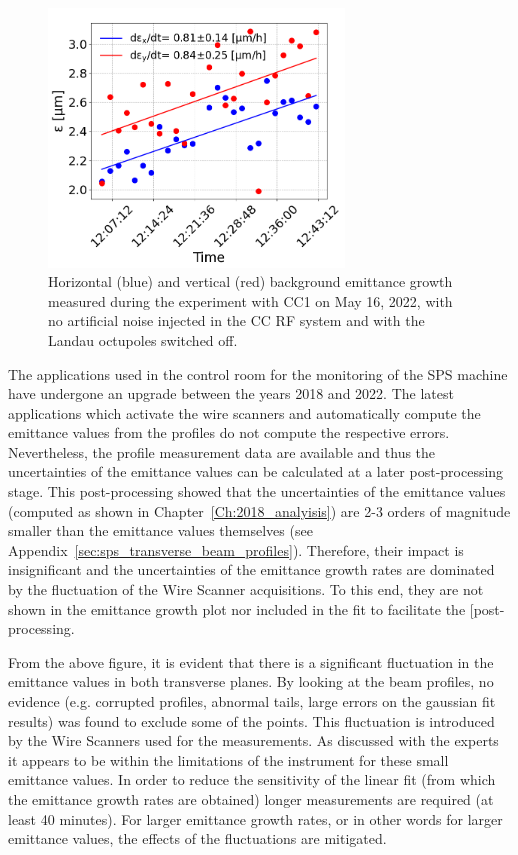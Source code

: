 \begin{figure}[!h] %
   \centering         
   \includegraphics[width=0.7\textwidth]{images/Ch8/cc_md_2022_background_in_scan.png}
       \caption{Horizontal (blue) and vertical (red) background emittance growth measured during the experiment with CC1 on May 16, 2022, with no artificial noise injected in the CC RF system and with the Landau octupoles switched off.}
       \label{fig:cc_md_2022_background_growth_in_scan}
\end{figure}

The applications used in the control room for the monitoring of the SPS machine have undergone an upgrade between the years 2018 and 2022. The latest applications which activate the wire scanners and automatically compute the emittance values from the profiles do not compute the respective errors. Nevertheless, the profile measurement data are available and thus the uncertainties of the emittance values can be calculated at a later post-processing stage. This post-processing showed that the uncertainties of the emittance values (computed as shown in Chapter~\ref{Ch:2018_analyisis}) are 2-3 orders of magnitude smaller than the emittance values themselves (see Appendix~\ref{sec:sps_transverse_beam_profiles}). Therefore, their impact is insignificant and the uncertainties of the emittance growth rates are dominated by the fluctuation of the Wire Scanner acquisitions. To this end, they are not shown in the emittance growth plot nor included in the fit to facilitate the [post-processing.

From the above figure, it is evident that there is a significant fluctuation in the emittance values in both transverse planes. By looking at the beam profiles, no evidence (e.g. corrupted profiles, abnormal tails, large errors on the gaussian fit results) was found to exclude some of the points. This fluctuation is introduced by the Wire Scanners used for the measurements. As discussed with the experts it appears to be within the limitations of the instrument for these small emittance values. In order to reduce the sensitivity of the linear fit (from which the emittance growth rates are obtained) longer measurements are required (at least 40 minutes). For larger emittance growth rates, or in other words for larger emittance values, the effects of the fluctuations are mitigated.

